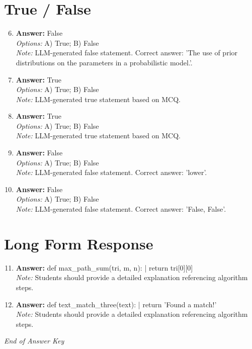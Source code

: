 \documentclass[12pt]{article}
\begin{document}
\section*{True / False}
\begin{enumerate}[label=\arabic*.]
\setcounter{enumi}{5}
\item \textbf{Answer:} False
\\ \textit{Options:} A) True; B) False
\\ \textit{Note:} LLM-generated false statement. Correct answer: 'The use of prior distributions on the parameters in a probabilistic model.'.
\item \textbf{Answer:} True
\\ \textit{Options:} A) True; B) False
\\ \textit{Note:} LLM-generated true statement based on MCQ.
\item \textbf{Answer:} True
\\ \textit{Options:} A) True; B) False
\\ \textit{Note:} LLM-generated true statement based on MCQ.
\item \textbf{Answer:} False
\\ \textit{Options:} A) True; B) False
\\ \textit{Note:} LLM-generated false statement. Correct answer: 'lower'.
\item \textbf{Answer:} False
\\ \textit{Options:} A) True; B) False
\\ \textit{Note:} LLM-generated false statement. Correct answer: 'False, False'.
\end{enumerate}

\section*{Long Form Response}
\begin{enumerate}[label=\arabic*.]
\setcounter{enumi}{10}
\item \textbf{Answer:} def max\_path\_sum(tri, m, n): | return tri[0][0]
\\ \textit{Note:} Students should provide a detailed explanation referencing algorithm steps.
\item \textbf{Answer:} def text\_match\_three(text): | return 'Found a match!'
\\ \textit{Note:} Students should provide a detailed explanation referencing algorithm steps.
\end{enumerate}

\vfill
\noindent\textit{End of Answer Key}
\end{document}

